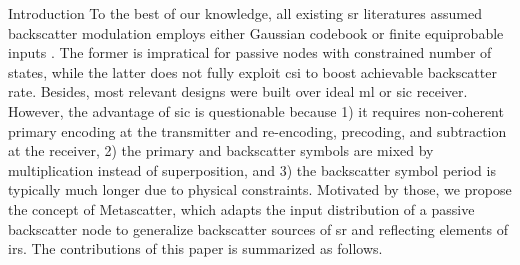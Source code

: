 \documentclass[journal]{IEEEtran}
\begin{document}
\begin{section}{Introduction}
	To the best of our knowledge, all existing \gls{sr} literatures assumed backscatter modulation employs either Gaussian codebook \cite{Guo2019b,Ding2020,Long2020a,Zhou2019a,Wu2021a,Xu2021a,Yang2021a} or finite equiprobable inputs \cite{Yang2018,Han2021,Zhang2022,Xu2020b,Hua2022,Hu2021a}.
	The former is impratical for passive nodes with constrained number of states, while the latter does not fully exploit \gls{csi} to boost achievable backscatter rate.
	Besides, most relevant designs \cite{Guo2019b,Ding2020,Long2020a,Zhou2019a,Wu2021a,Xu2021a,Yang2021a,Yang2018,Han2021,Zhang2022,Xu2020b,Hua2022} were built over ideal \gls{ml} or \gls{sic} receiver.
	However, the advantage of \gls{sic} is questionable because 1) it requires non-coherent primary encoding at the transmitter and re-encoding, precoding, and subtraction at the receiver, 2) the primary and backscatter symbols are mixed by multiplication instead of superposition, and 3) the backscatter symbol period is typically much longer due to physical constraints.
	Motivated by those, we propose the concept of Metascatter, which adapts the input distribution of a passive backscatter node to generalize backscatter sources of \gls{sr} and reflecting elements of \gls{irs}.
	The contributions of this paper is summarized as follows.


\end{section}
\end{document}
